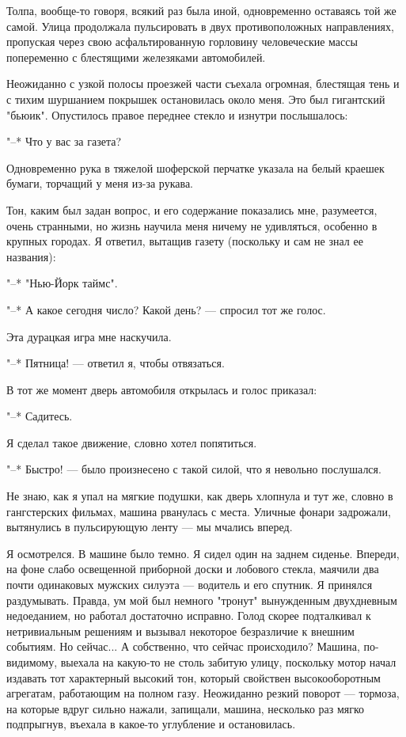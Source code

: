 Толпа, вообще-то говоря, всякий раз была иной,  одновременно  оставаясь
той  же  самой.  Улица  продолжала  пульсировать  в  двух  противоположных
направлениях, пропуская через свою асфальтированную горловину человеческие
массы попеременно с блестящими железяками автомобилей.

Неожиданно с узкой полосы проезжей части  съехала  огромная,  блестящая
тень и с  тихим  шуршанием  покрышек  остановилась  около  меня.  Это  был
гигантский  "бьюик".  Опустилось  правое   переднее   стекло   и   изнутри
послышалось:

"--* Что у вас за газета?

Одновременно рука в тяжелой шоферской перчатке указала на белый краешек
бумаги, торчащий у меня из-за рукава.

Тон,  каким  был  задан  вопрос,  и  его  содержание  показались   мне,
разумеется, очень странными, но жизнь научила меня ничему  не  удивляться,
особенно в крупных городах. Я ответил, вытащив газету (поскольку и сам  не
знал ее названия):

"--* "Нью-Йорк таймс".

"--* А какое сегодня число? Какой день? --- спросил тот же голос.

Эта дурацкая игра мне наскучила.

"--* Пятница! --- ответил я, чтобы отвязаться.

В тот же момент дверь автомобиля открылась и голос приказал:

"--* Садитесь.

Я сделал такое движение, словно хотел попятиться.

"--* Быстро! --- было произнесено с такой силой, что я невольно послушался.

Не знаю, как я упал на мягкие подушки, как дверь  хлопнула  и  тут  же,
словно в гангстерских фильмах, машина рванулась с  места.  Уличные  фонари
задрожали, вытянулись в пульсирующую ленту --- мы мчались вперед.

Я осмотрелся. В машине было темно. Я  сидел  один  на  заднем  сиденье.
Впереди, на фоне слабо  освещенной  приборной  доски  и  лобового  стекла,
маячили два почти одинаковых мужских силуэта --- водитель и его  спутник.  Я
принялся раздумывать. Правда, ум  мой  был  немного  "тронут"  вынужденным
двухдневным недоеданием, но  работал  достаточно  исправно.  Голод  скорее
подталкивал к нетривиальным решениям и  вызывал  некоторое  безразличие  к
внешним событиям. Но  сейчас...  А  собственно,  что  сейчас  происходило?
Машина, по-видимому, выехала на какую-то не столь забитую улицу, поскольку
мотор начал  издавать  тот  характерный  высокий  тон,  который  свойствен
высокооборотным агрегатам, работающим на полном  газу.  Неожиданно  резкий
поворот --- тормоза, на  которые  вдруг  сильно  нажали,  запищали,  машина,
несколько  раз  мягко  подпрыгнув,  въехала  в   какое-то   углубление   и
остановилась.

